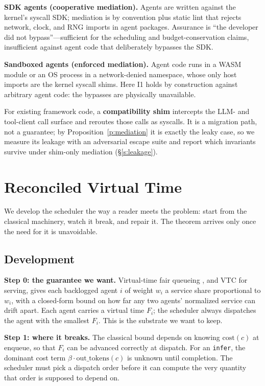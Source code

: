 \documentclass[letterpaper,11pt,leqno]{article}
\begin{document}
\textbf{SDK agents (cooperative mediation).} Agents are written against the kernel's syscall SDK; mediation is by convention plus static lint that rejects network, clock, and RNG imports in agent packages. Assurance is ``the developer did not bypass''---sufficient for the scheduling and budget-conservation claims, insufficient against agent code that deliberately bypasses the SDK.

\textbf{Sandboxed agents (enforced mediation).} Agent code runs in a WASM module \citep{Haas17} or an OS process in a network-denied namespace, whose only host imports are the kernel syscall shims. Here I1 holds by construction against arbitrary agent code: the bypasses are physically unavailable.

For existing framework code, a \textbf{compatibility shim} intercepts the LLM- and tool-client call surface and reroutes those calls as syscalls. It is a migration path, not a guarantee; by Proposition~\ref{p:mediation} it is exactly the leaky case, so we measure its leakage with an adversarial escape suite and report which invariants survive under shim-only mediation (\S\ref{s:leakage}).

\section{Reconciled Virtual Time}\label{s:rvt}

We develop the scheduler the way a reader meets the problem: start from the classical machinery, watch it break, and repair it. The theorem arrives only once the need for it is unavoidable.

\subsection{Development}\label{s:rvt-dev}

\textbf{Step 0: the guarantee we want.} Virtual-time fair queueing \citep{Demers89, Goyal96}, and VTC \citep{Sheng24} for serving, gives each backlogged agent $i$ of weight $w_i$ a service share proportional to $w_i$, with a closed-form bound on how far any two agents' normalized service can drift apart. Each agent carries a virtual time $F_i$; the scheduler always dispatches the agent with the smallest $F_i$. This is the substrate we want to keep.

\textbf{Step 1: where it breaks.} The classical bound depends on knowing $\mathrm{cost}(c)$ at enqueue, so that $F_i$ can be advanced correctly at dispatch. For an \texttt{infer}, the dominant cost term $\beta \cdot \mathrm{out\_tokens}(c)$ is unknown until completion. The scheduler must pick a dispatch order before it can compute the very quantity that order is supposed to depend on.
\end{document}
